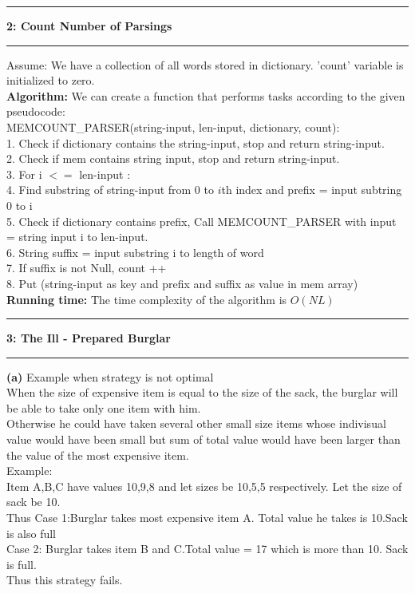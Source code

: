 \documentclass[11pt]{article}
\newcommand\question[2]{\vspace{.25in}\hrule\textbf{#1: #2}\vspace{.5em}\hrule\vspace{.10in}}
\renewcommand\part[1]{\vspace{.10in}\textbf{(#1)}}
\newcommand\algorithm{\vspace{.10in}\textbf{Algorithm: }}
\newcommand\runtime{\vspace{.10in}\textbf{Running time: }}
\begin{document}
\question{2}{Count Number of Parsings}
Assume: We have a collection of all words stored in dictionary. 'count' variable is initialized to zero.\\
\algorithm We can create a function that performs tasks according to the given pseudocode:
\\MEMCOUNT\_PARSER(string-input, len-input, dictionary, count):
\\1. Check if dictionary contains the string-input, stop and return string-input.
\\2. Check if mem contains string input, stop and return string-input.
\\3. For i $<=$ len-input :
\\4. Find substring of string-input from 0 to $i$th index and prefix = input subtring 0 to i
\\5. Check if dictionary contains prefix, Call MEMCOUNT\_PARSER with input = string input i to len-input. 
\\6. String suffix = input substring i to length of word
\\7. If suffix is not Null, count ++
\\8. Put (string-input as key and prefix and suffix as value in mem array) 
\runtime The time complexity of the algorithm is $O(NL)$

\newpage

\question{3}{The Ill - Prepared Burglar}
 
\part{a}
Example when strategy is not optimal\\
When the size of expensive item is equal to the size of the sack, the burglar will be able to take only one item with him.\\
Otherwise he could have taken several other small size items whose indivisual value would have been small but sum of total value would have been larger than the value of the most expensive item.\\
Example:\\
Item A,B,C have values 10,9,8 and let sizes be 10,5,5 respectively. Let the size of sack be 10. \\Thus Case 1:Burglar takes most expensive item A. Total value he takes is 10.Sack is also full \\Case 2: Burglar takes item B and C.Total value = 17 which is more than 10. Sack is full.\\Thus this strategy fails.\\
\end{document}
